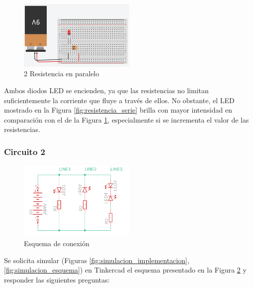 \documentclass{article}
\begin{document}
\begin{figure}[H]
    \centering
    \includegraphics[width=0.5\textwidth]{./img/ckpt_2_2.png}
    \caption{2 Resistencia en paralelo}
    \label{fig:resistencia_paralelo}
\end{figure}

Ambos diodos LED se encienden, ya que las resistencias no limitan suficientemente la corriente que fluye a través de ellos. No obstante, el LED mostrado en la Figura \ref{fig:resistencia_serie} brilla con mayor intensidad en comparación con el de la Figura \ref{fig:resistencia_paralelo}, especialmente si se incrementa el valor de las resistencias.

\subsubsection{Circuito 2}

\begin{figure}[H]
    \centering
    \includegraphics[width=0.5\textwidth]{./img/ckpt_2_3_0.png}
    \caption{Esquema de conexión}
    \label{fig:circuito_2}
\end{figure}

Se solicita simular (Figuras \ref{fig:simulacion_implementacion}, \ref{fig:simulacion_esquema}) en Tinkercad el esquema presentado en la Figura \ref{fig:circuito_2} y responder las siguientes preguntas:
\end{document}
